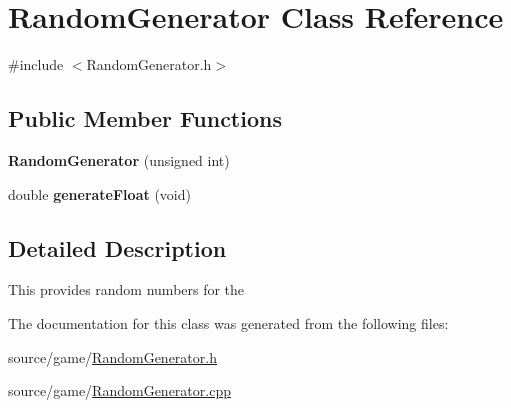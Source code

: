 \hypertarget{classRandomGenerator}{
\section{RandomGenerator Class Reference}
\label{classRandomGenerator}
}


{\ttfamily \#include $<$RandomGenerator.h$>$}\subsection*{Public Member Functions}
\begin{DoxyCompactItemize}
\item 
\hypertarget{classRandomGenerator_addcda615af9b184d61705dacd0cc0a9a}{
{\bfseries RandomGenerator} (unsigned int)}
\label{classRandomGenerator_addcda615af9b184d61705dacd0cc0a9a}

\item 
\hypertarget{classRandomGenerator_ae10cbb24c2728a4d8d441f2774ac8b99}{
double {\bfseries generateFloat} (void)}
\label{classRandomGenerator_ae10cbb24c2728a4d8d441f2774ac8b99}

\end{DoxyCompactItemize}


\subsection{Detailed Description}
This provides random numbers for the 

The documentation for this class was generated from the following files:\begin{DoxyCompactItemize}
\item 
source/game/\hyperlink{RandomGenerator_8h}{RandomGenerator.h}\item 
source/game/\hyperlink{RandomGenerator_8cpp}{RandomGenerator.cpp}\end{DoxyCompactItemize}
